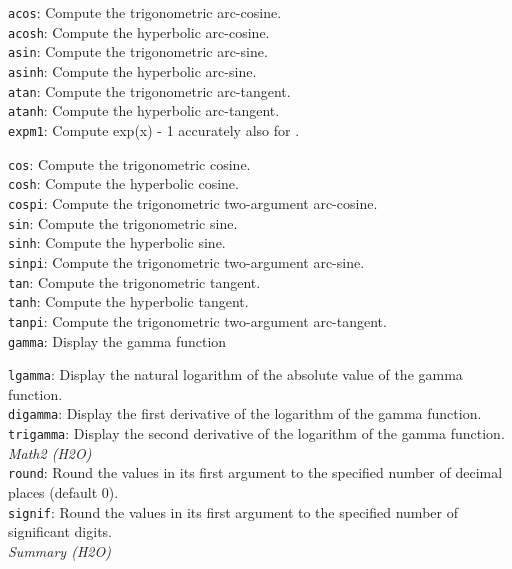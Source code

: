 \documentclass[11pt]{article}
\begin{document}
\begin{enumerate}
{{\texttt{acos}}: Compute the trigonometric arc-cosine. \\
{\texttt{acosh}}: Compute the hyperbolic arc-cosine. \\
{\texttt{asin}}: Compute the trigonometric arc-sine.\\
{\texttt{asinh}}: Compute the hyperbolic arc-sine.\\
{\texttt{atan}}: Compute the trigonometric arc-tangent. \\
{\texttt{atanh}}: Compute the hyperbolic arc-tangent.\\
{\texttt{expm1}}: Compute exp(x) - 1 accurately also for {}. 

{\texttt{cos}}: Compute the trigonometric cosine.\\
{\texttt{cosh}}: Compute the hyperbolic cosine. \\
{\texttt{cospi}}: Compute the trigonometric two-argument arc-cosine. \\
{\texttt{sin}}: Compute the trigonometric sine. \\
{\texttt{sinh}}: Compute the hyperbolic sine. \\
{\texttt{sinpi}}: Compute the trigonometric two-argument arc-sine. \\
{\texttt{tan}}: Compute the trigonometric tangent.\\
{\texttt{tanh}}: Compute the hyperbolic tangent.\\
{\texttt{tanpi}}: Compute the trigonometric two-argument arc-tangent. \\
{\texttt{gamma}}: Display the gamma function {} 

{\texttt{lgamma}}: Display the natural logarithm of the absolute value of the gamma function. \\
{\texttt{digamma}}: Display the first derivative of the logarithm of the gamma function. \\
{\texttt{trigamma}}: Display the second derivative of the logarithm of the gamma function.\\

\textit{Math2 (H2O)}\\

{\texttt{round}}: Round the values in its first argument to the specified number of decimal places (default 0). \\
{\texttt{signif}}: Round the values in its first argument to the specified number of significant digits.\\

\textit{Summary (H2O)}

}
\end{enumerate}
\end{document}

